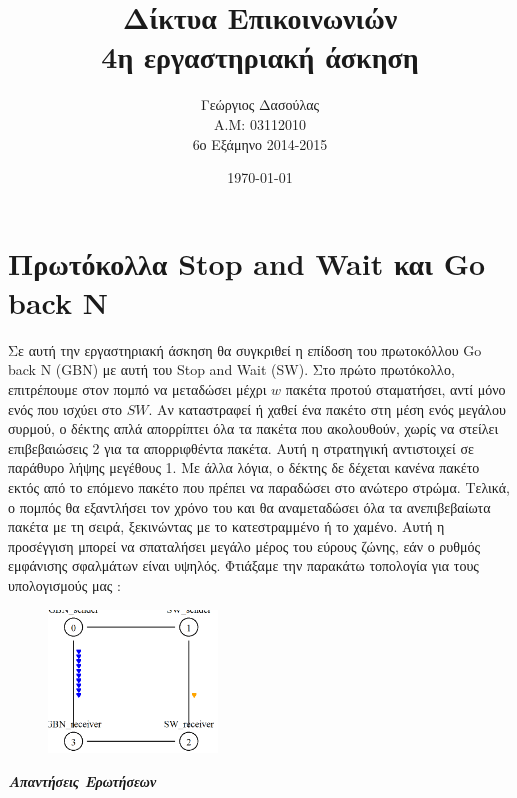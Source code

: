 \documentclass{article}%
\begin{document}

\title{Δίκτυα Επικοινωνιών\\4η εργαστηριακή άσκηση}
\author{Γεώργιος Δασούλας\\Α.Μ: 03112010 \\ 6ο Εξάμηνο 2014-2015  }
\date{\today}
\maketitle

\section { Πρωτόκολλα \textlatin{Stop and Wait} και \textlatin{Go back N}}
Σε αυτή την εργαστηριακή άσκηση θα συγκριθεί η επίδοση του πρωτοκόλλου \textlatin{Go back N (GBN)} με αυτή
του \textlatin{Stop and Wait (SW)}. Στο πρώτο πρωτόκολλο, επιτρέπουμε στον πομπό να μεταδώσει μέχρι $w$ πακέτα
προτού σταματήσει, αντί μόνο ενός που ισχύει στο $SW$. Αν καταστραφεί ή χαθεί ένα πακέτο στη μέση ενός
μεγάλου συρμού, ο δέκτης απλά απορρίπτει όλα τα πακέτα που ακολουθούν, χωρίς να στείλει επιβεβαιώσεις
2 για τα απορριφθέντα πακέτα. Αυτή η στρατηγική αντιστοιχεί σε παράθυρο λήψης μεγέθους 1. Με άλλα λόγια,
ο δέκτης δε δέχεται κανένα πακέτο εκτός από το επόμενο πακέτο που πρέπει να παραδώσει στο ανώτερο
στρώμα. Τελικά, ο πομπός θα εξαντλήσει τον χρόνο του και θα αναμεταδώσει όλα τα ανεπιβεβαίωτα πακέτα με
τη σειρά, ξεκινώντας με το κατεστραμμένο ή το χαμένο. Αυτή η προσέγγιση μπορεί να σπαταλήσει μεγάλο
μέρος του εύρους ζώνης, εάν ο ρυθμός εμφάνισης σφαλμάτων είναι υψηλός. Φτιάξαμε την παρακάτω τοπολογία για τους υπολογισμούς μας : 
\begin{figure}[htbp]
	\centering
		\includegraphics[width=0.40\textwidth]{8.png}
	\label{fig:8}
\end{figure}
\newpage
\textbf{\textsl{Απαντήσεις Ερωτήσεων}}
\end{document}
